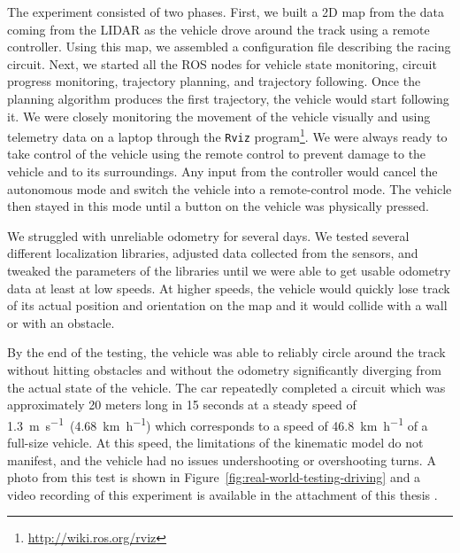 The experiment consisted of two phases. First, we built a 2D map from the data coming from the \gls*{LIDAR} as the vehicle drove around the track using a remote controller. Using this map, we assembled a configuration file describing the racing circuit. Next, we started all the \gls{ROS} nodes for vehicle state monitoring, circuit progress monitoring, trajectory planning, and trajectory following. Once the planning algorithm produces the first trajectory, the vehicle would start following it. We were closely monitoring the movement of the vehicle visually and using telemetry data on a laptop through the \texttt{Rviz} program\footnote{\url{http://wiki.ros.org/rviz}}. We were always ready to take control of the vehicle using the remote control to prevent damage to the vehicle and to its surroundings. Any input from the controller would cancel the autonomous mode and switch the vehicle into a remote-control mode. The vehicle then stayed in this mode until a button on the vehicle was physically pressed.

We struggled with unreliable odometry for several days. We tested several different localization libraries, adjusted data collected from the sensors, and tweaked the parameters of the libraries until we were able to get usable odometry data at least at low speeds. At higher speeds, the vehicle would quickly lose track of its actual position and orientation on the map and it would collide with a wall or with an obstacle.

By the end of the testing, the vehicle was able to reliably circle around the track without hitting obstacles and without the odometry significantly diverging from the actual state of the vehicle. The car repeatedly completed a circuit which was approximately 20 meters long in 15 seconds at a steady speed of \SI{1.3}{\meter\per\second}~(\SI{4.68}{\kilo\meter\per\hour}) which corresponds to a speed of \SI{46.8}{\kilo\meter\per\hour} of a full-size vehicle. At this speed, the limitations of the kinematic model do not manifest, and the vehicle had no issues undershooting or overshooting turns. A photo from this test is shown in Figure~\ref{fig:real-world-testing-driving} and a video recording of this experiment is available in the attachment of this thesis .

